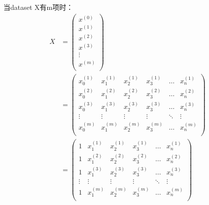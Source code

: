 \documentclass[12pt]{article}   %
\begin{document}
当dataset X有m项时：
\begin{equation}
\begin{aligned}
X & = 
	\left(
		\begin{matrix}
			x^{(0)} \\
			x^{(1)} \\
			x^{(2)} \\
			x^{(3)} \\
			\vdots \\
			x^{(m)} \\
		\end{matrix}
	\right) \\
& =
	\left(
		\begin{matrix}
		x_0^{(1)} & x_1^{(1)} & x_2^{(1)} & x_3^{(1)} & \dots & x_n^{(1)} \\
		x_0^{(2)} & x_1^{(2)} & x_2^{(2)} & x_3^{(2)} & \dots & x_n^{(2)} \\
		x_0^{(3)} & x_1^{(3)} & x_2^{(3)} & x_3^{(3)} & \dots & x_n^{(3)} \\
		\vdots    & \vdots    & \vdots    & \vdots    & \ddots & \vdots   \\
		x_0^{(m)} & x_1^{(m)} & x_2^{(m)} & x_3^{(m)} & \dots & x_n^{(m)} \\
		\end{matrix}
	\right) \\
& =
		\left(
		\begin{matrix}
		1 & x_1^{(1)} & x_2^{(1)} & x_3^{(1)} & \dots & x_n^{(1)} \\
		1 & x_1^{(2)} & x_2^{(2)} & x_3^{(2)} & \dots & x_n^{(2)} \\
		1 & x_1^{(3)} & x_2^{(3)} & x_3^{(3)} & \dots & x_n^{(3)} \\
		\vdots    & \vdots    & \vdots    & \vdots    & \ddots & \vdots   \\
		1 & x_1^{(m)} & x_2^{(m)} & x_3^{(m)} & \dots & x_n^{(m)} \\
		\end{matrix}
	\right)
\end{aligned}
\end{equation}
\end{document}
